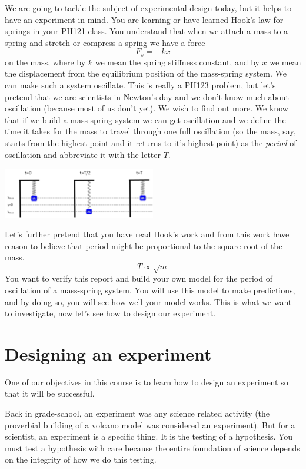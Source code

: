 \documentclass[twoside,11pt,ShortChapTitles]{BYUTextbook}
\begin{document}
We are going to tackle the subject of experimental design today, but it helps
to have an experiment in mind. You are learning or have learned Hook's law for
springs in your PH121 class. You understand that when we attach a mass to a
spring and stretch or compress a spring we have a force
\[
F_{s}=-kx
\]
on the mass, where by $k$ we mean the spring stiffness constant, and by $x$ we
mean the displacement from the equilibrium position of the mass-spring system.
We can make such a system oscillate. This is really a PH123 problem, but let's
pretend that we are scientists in Newton's day and we don't know much about
oscillation (because most of us don't yet). We wish to find out more. We know
that if we build a mass-spring system we can get oscillation and we define the
time it takes for the mass to travel through one full oscillation (so the
mass, say, starts from the highest point and it returns to it's highest point)
as the \emph{period} of oscillation and abbreviate it with the letter $T.$
\begin{center}
\includegraphics[width=0.5\textwidth
]
{Lab4_figs/massOnSpring.png}
\end{center}
Let's further pretend that you have read Hook's work and from this work have
reason to believe that period might be proportional to the square root of the
mass.
\[
T\propto\sqrt{m}
\]
You want to verify this report and build your own model for the period of
oscillation of a mass-spring system. You will use this model to make
predictions, and by doing so, you will see how well your model works. This is
what we want to investigate, now let's see how to design our experiment.

\section{Designing an experiment}

One of our objectives in this course is to learn how to design an experiment
so that it will be successful.

Back in grade-school, an experiment was any science related activity (the
proverbial building of a volcano model was considered an experiment). But for
a scientist, an experiment is a specific thing. It is the testing of a
hypothesis. You must test a hypothesis with care because the entire foundation
of science depends on the integrity of how we do this testing.
\end{document}
